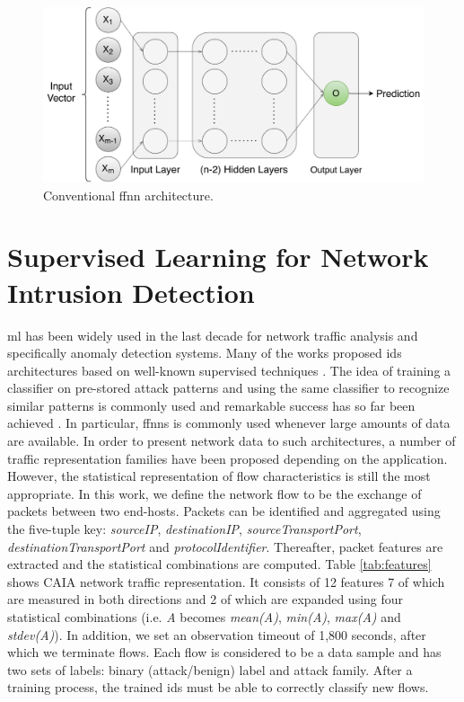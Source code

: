 \documentclass[conference]{IEEEtran}
\begin{document}
 \begin{figure}
  \includegraphics[width=\linewidth]{figures/ffnn_new.pdf}
  \caption{Conventional \gls{ffnn} architecture.}
  \label{fig:ffnn}
\end{figure}

\section{Supervised Learning for Network Intrusion Detection}

\gls{ml} has been widely used in the last decade for network traffic analysis and specifically anomaly detection systems. Many of the works proposed \gls{ids} architectures based on well-known supervised techniques \cite{survey}. The idea of training a classifier on pre-stored attack patterns and using the same classifier to recognize similar patterns is commonly used and remarkable success has so far been achieved \cite{survey}. In particular, \glspl{ffnn} is commonly used whenever large amounts of data are available. In order to present network data to such architectures, a number of traffic representation families have been proposed depending on the application. However, the statistical representation of flow characteristics is still the most appropriate. In this work, we define the network flow to be the exchange of packets between two end-hosts. Packets can be identified and aggregated using the five-tuple key: \emph{sourceIP}, \emph{destinationIP}, \emph{sourceTransportPort}, \emph{destinationTransportPort} and \emph{protocolIdentifier}. Thereafter, packet features are extracted and the statistical combinations are computed. Table \ref{tab:features} shows CAIA \cite{williams_preliminary_2006} network traffic representation. It consists of 12 features 7 of which are measured in both directions and 2 of which are expanded using four statistical combinations (i.e. \emph{A} becomes \emph{mean(A)}, \emph{min(A)}, \emph{max(A)} and \emph{stdev(A)}). In addition, we set an observation timeout of 1,800 seconds, after which we terminate flows. Each flow is considered to be a data sample and has two sets of labels: binary (attack/benign) label and attack family. After a training process, the trained \gls{ids} must be able to correctly classify new flows.
\end{document}
